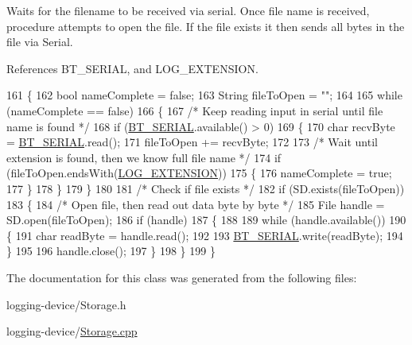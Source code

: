 Waits for the filename to be received via serial. Once file name is received, procedure attempts to open the file. If the file exists it then sends all bytes in the file via Serial. 

References B\+T\+\_\+\+S\+E\+R\+I\+AL, and L\+O\+G\+\_\+\+E\+X\+T\+E\+N\+S\+I\+ON.


\begin{DoxyCode}
161 \{
162   \textcolor{keywordtype}{bool} nameComplete = \textcolor{keyword}{false};
163   String fileToOpen = \textcolor{stringliteral}{""};
164 
165   \textcolor{keywordflow}{while} (nameComplete == \textcolor{keyword}{false})
166   \{
167     \textcolor{comment}{/* Keep reading input in serial until file name is found */}
168     \textcolor{keywordflow}{if} (\hyperlink{_storage_8cpp_ad1e6e6f6fc813b305067b9e1b0777ea6}{BT\_SERIAL}.available() > 0)
169     \{
170       \textcolor{keywordtype}{char} recvByte = \hyperlink{_storage_8cpp_ad1e6e6f6fc813b305067b9e1b0777ea6}{BT\_SERIAL}.read();
171       fileToOpen += recvByte;
172 
173       \textcolor{comment}{/* Wait until extension is found, then we know full file name */}
174       \textcolor{keywordflow}{if} (fileToOpen.endsWith(\hyperlink{_storage_8cpp_a907e440e32d31fd828188004703e3178}{LOG\_EXTENSION}))
175       \{
176         nameComplete = \textcolor{keyword}{true};
177       \}
178     \}
179   \}
180 
181   \textcolor{comment}{/* Check if file exists */}
182   \textcolor{keywordflow}{if} (SD.exists(fileToOpen))
183   \{
184     \textcolor{comment}{/* Open file, then read out data byte by byte */}
185     File handle = SD.open(fileToOpen);
186     \textcolor{keywordflow}{if} (handle)
187     \{
188 
189       \textcolor{keywordflow}{while} (handle.available())
190       \{
191         \textcolor{keywordtype}{char} readByte = handle.read();
192 
193         \hyperlink{_storage_8cpp_ad1e6e6f6fc813b305067b9e1b0777ea6}{BT\_SERIAL}.write(readByte);
194       \}
195 
196       handle.close();
197     \}
198   \}
199 \}
\end{DoxyCode}


The documentation for this class was generated from the following files\+:\begin{DoxyCompactItemize}
\item 
logging-\/device/Storage.\+h\item 
logging-\/device/\hyperlink{_storage_8cpp}{Storage.\+cpp}\end{DoxyCompactItemize}
